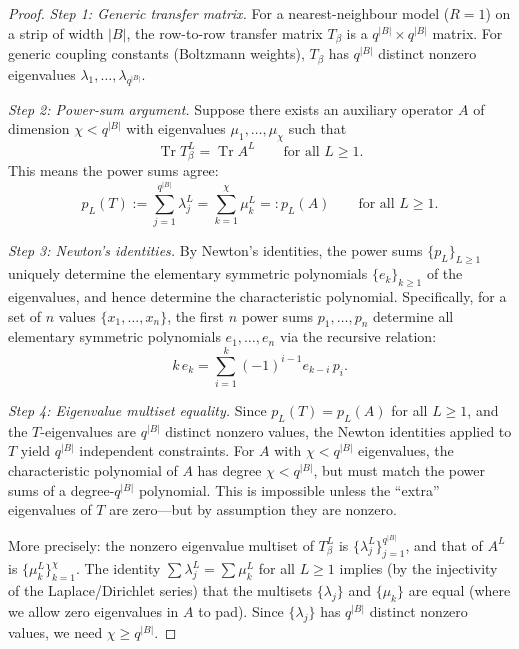 \documentclass[12pt]{article}
\theoremstyle{plain}
\theoremstyle{definition}
\numberwithin{equation}{section}
\DeclareMathOperator{\Tr}{Tr}
\begin{document}
\begin{proof}
\emph{Step 1: Generic transfer matrix.}
For a nearest-neighbour model ($R=1$) on a strip of width $|B|$,
the row-to-row transfer matrix $T_\beta$ is a
$q^{|B|}\times q^{|B|}$ matrix.  For generic coupling constants
(Boltzmann weights), $T_\beta$ has $q^{|B|}$ distinct nonzero
eigenvalues $\lambda_1,\ldots,\lambda_{q^{|B|}}$.

\emph{Step 2: Power-sum argument.}
Suppose there exists an auxiliary operator $A$ of dimension
$\chi<q^{|B|}$ with eigenvalues $\mu_1,\ldots,\mu_\chi$ such that
\begin{equation}
\Tr T_\beta^L = \Tr A^L\qquad\text{for all }L\geq 1.
\end{equation}
This means the power sums agree:
\begin{equation}
p_L(T) := \sum_{j=1}^{q^{|B|}}\lambda_j^L
= \sum_{k=1}^{\chi}\mu_k^L =: p_L(A)
\qquad\text{for all }L\geq 1.
\end{equation}

\emph{Step 3: Newton's identities.}
By Newton's identities, the power sums $\{p_L\}_{L\geq 1}$ uniquely
determine the elementary symmetric polynomials
$\{e_k\}_{k\geq 1}$ of the eigenvalues, and hence determine the
characteristic polynomial.  Specifically, for a set of $n$ values
$\{x_1,\ldots,x_n\}$, the first $n$ power sums $p_1,\ldots,p_n$
determine all elementary symmetric polynomials $e_1,\ldots,e_n$
via the recursive relation:
\begin{equation}
k\,e_k = \sum_{i=1}^{k}(-1)^{i-1}e_{k-i}\,p_i.
\end{equation}

\emph{Step 4: Eigenvalue multiset equality.}
Since $p_L(T)=p_L(A)$ for all $L\geq 1$, and the $T$-eigenvalues
are $q^{|B|}$ distinct nonzero values, the Newton identities applied
to $T$ yield $q^{|B|}$ independent constraints.  For $A$ with
$\chi<q^{|B|}$ eigenvalues, the characteristic polynomial of $A$
has degree $\chi<q^{|B|}$, but must match the power sums of a
degree-$q^{|B|}$ polynomial.  This is impossible unless the
``extra'' eigenvalues of $T$ are zero---but by assumption they are
nonzero.

More precisely: the nonzero eigenvalue multiset of $T_\beta^L$ is
$\{\lambda_j^L\}_{j=1}^{q^{|B|}}$, and that of $A^L$ is
$\{\mu_k^L\}_{k=1}^{\chi}$.  The identity
$\sum\lambda_j^L=\sum\mu_k^L$ for all $L\geq 1$ implies (by the
injectivity of the Laplace/Dirichlet series) that the multisets
$\{\lambda_j\}$ and $\{\mu_k\}$ are equal (where we allow zero
eigenvalues in $A$ to pad).  Since $\{\lambda_j\}$ has $q^{|B|}$
distinct nonzero values, we need $\chi\geq q^{|B|}$.
\end{proof}
\end{document}
